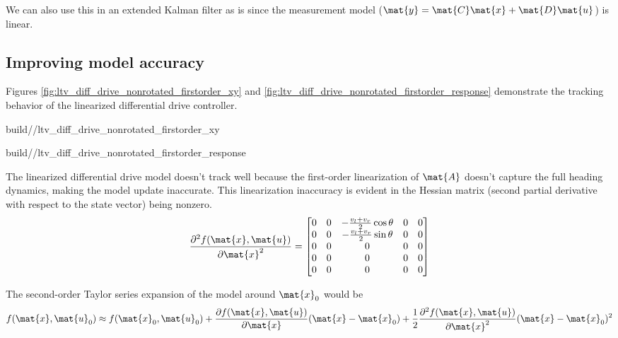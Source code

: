 We can also use this in an extended Kalman filter as is since the measurement
model ($\mat{y} = \mat{C}\mat{x} + \mat{D}\mat{u}$) is linear.

\subsection{Improving model accuracy}

Figures \ref{fig:ltv_diff_drive_nonrotated_firstorder_xy} and
\ref{fig:ltv_diff_drive_nonrotated_firstorder_response} demonstrate the
tracking behavior of the linearized differential drive controller.
\begin{bookfigure}
  \begin{minisvg}{2}{build/\chapterpath/ltv_diff_drive_nonrotated_firstorder_xy}
    \caption{Linear time-varying differential drive controller x-y plot
      (first-order)}
    \label{fig:ltv_diff_drive_nonrotated_firstorder_xy}
  \end{minisvg}
  \hfill
  \begin{minisvg}{2}{build/\chapterpath/ltv_diff_drive_nonrotated_firstorder_response}
    \caption{Linear time-varying differential drive controller response
      (first-order)}
    \label{fig:ltv_diff_drive_nonrotated_firstorder_response}
  \end{minisvg}
\end{bookfigure}

The linearized differential drive model doesn't track well because the
first-order linearization of $\mat{A}$ doesn't capture the full heading
dynamics, making the \gls{model} update inaccurate. This linearization
inaccuracy is evident in the Hessian matrix (second partial derivative with
respect to the state vector) being nonzero.
\begin{equation*}
  \frac{\partial^2 f(\mat{x}, \mat{u})}{\partial\mat{x}^2} =
  \begin{bmatrix}
    0 & 0 & -\frac{v_l + v_r}{2}\cos\theta & 0 & 0 \\
    0 & 0 & -\frac{v_l + v_r}{2}\sin\theta & 0 & 0 \\
    0 & 0 & 0 & 0 & 0 \\
    0 & 0 & 0 & 0 & 0 \\
    0 & 0 & 0 & 0 & 0
  \end{bmatrix}
\end{equation*}

The second-order Taylor series expansion of the \gls{model} around $\mat{x}_0$
would be
\begin{equation*}
  f(\mat{x}, \mat{u}_0) \approx f(\mat{x}_0, \mat{u}_0) +
    \frac{\partial f(\mat{x}, \mat{u})}{\partial\mat{x}}(\mat{x} - \mat{x}_0) +
    \frac{1}{2}\frac{\partial^2 f(\mat{x}, \mat{u})}{\partial\mat{x}^2}
    (\mat{x} - \mat{x}_0)^2
\end{equation*}


